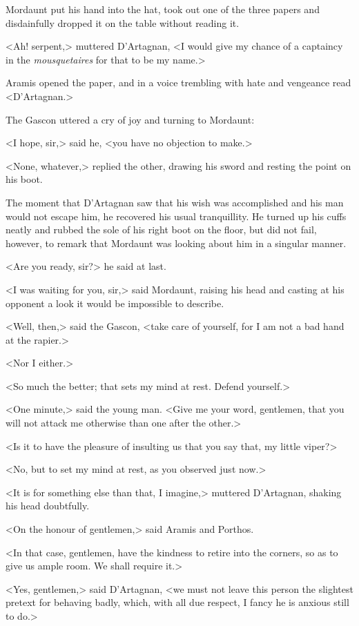 Mordaunt put his hand into the hat, took out one of the three papers and disdainfully dropped it on the table without reading it.

<Ah! serpent,> muttered D'Artagnan, <I would give my chance of a captaincy in the \emph{mousquetaires} for that to be my name.>

Aramis opened the paper, and in a voice trembling with hate and vengeance read <D'Artagnan.>

The Gascon uttered a cry of joy and turning to Mordaunt:

<I hope, sir,> said he, <you have no objection to make.>

<None, whatever,> replied the other, drawing his sword and resting the point on his boot.

The moment that D'Artagnan saw that his wish was accomplished and his man would not escape him, he recovered his usual tranquillity. He turned up his cuffs neatly and rubbed the sole of his right boot on the floor, but did not fail, however, to remark that Mordaunt was looking about him in a singular manner.

<Are you ready, sir?> he said at last.

<I was waiting for you, sir,> said Mordaunt, raising his head and casting at his opponent a look it would be impossible to describe.

<Well, then,> said the Gascon, <take care of yourself, for I am not a bad hand at the rapier.>

<Nor I either.>

<So much the better; that sets my mind at rest. Defend yourself.>

<One minute,> said the young man. <Give me your word, gentlemen, that you will not attack me otherwise than one after the other.>

<Is it to have the pleasure of insulting us that you say that, my little viper?>

<No, but to set my mind at rest, as you observed just now.>

<It is for something else than that, I imagine,> muttered D'Artagnan, shaking his head doubtfully.

<On the honour of gentlemen,> said Aramis and Porthos.

<In that case, gentlemen, have the kindness to retire into the corners, so as to give us ample room. We shall require it.>

<Yes, gentlemen,> said D'Artagnan, <we must not leave this person the slightest pretext for behaving badly, which, with all due respect, I fancy he is anxious still to do.>

